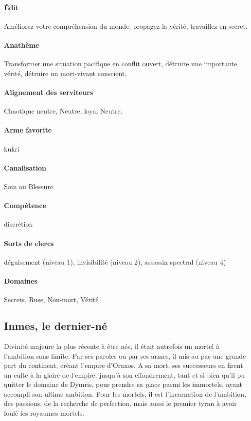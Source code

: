 \documentclass[10pt,a4paper]{book}
\begin{document}
\paragraph{Édit} Améliorez votre compréhension du monde, propagez la vérité, travaillez en secret.
\paragraph{Anathème} Transformer une situation pacifique en conflit ouvert, détruire une importante vérité, détruire un mort-vivant conscient.
\paragraph{Alignement des serviteurs} Chaotique neutre, Neutre, loyal Neutre.
\paragraph{Arme favorite }kukri
\paragraph{Canalisation} Soin ou Blessure
\paragraph{Compétence} discrétion
\paragraph{Sorts de clercs}déguisement (niveau 1), invisibilité (niveau 2), assassin spectral (niveau 4)
\paragraph{Domaines }Secrets, Ruse, Non-mort, Vérité
\subsection{Inmes, le dernier-né}
Divinité majeure la plus récente à être née, il était autrefois un mortel à l'ambition sans limite. Par ses paroles ou par ses armes, il mis au pas une grande part du continent, créant l'empire d'Oraxos. A sa mort, ses successeurs en firent un culte à la gloire de l'empire, jusqu'à son effondrement, tant et si bien qu'il pu quitter le domaine de Dymris, pour prendre sa place parmi les immortels, ayant accompli son ultime ambition. Pour les mortels, il est l'incarnation de l'ambition, des passions, de la recherche de perfection, mais aussi le premier tyran à avoir foulé les royaumes mortels.
\end{document}
